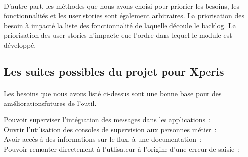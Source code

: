			\paragraph{}%
			D'autre part, les méthodes que nous avons choisi pour priorier les besoins,
			les fonctionnalités et les user stories sont également arbitraires. La
			priorisation des besoin à impacté la liste des fonctionnalité de laquelle
			découle le backlog. La priorisation des user stories n'impacte que l'ordre
			dans lequel le module est développé.
			
		\subsection{Les suites possibles du projet pour Xperis}
			\paragraph{}%
			Les besoins que nous avons listé ci-dessus sont une bonne base pour des
			améliorationsfutures de l'outil.
			\begin{description}
				\item[Pouvoir superviser l'intégration des messages dans les applications~:]
				\item[Ouvrir l'utilisation des consoles de supervision aux personnes
				métier~:]
				\item[Avoir accès à des informations sur le flux, à une documentation~:]
				\item[Pouvoir remonter directement à l'utlisateur à l'origine d'une erreur
			  	de saisie~:]
			\end{description}
			
			\paragraph{}%
			
			